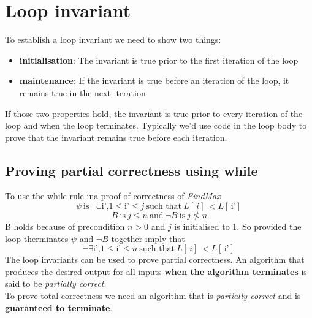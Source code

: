 \documentclass{article}
\begin{document}
\section{Loop invariant}
\begin{center}
\end{center}

\begin{flushleft}
To establish a loop invariant we need to show two things:
\begin{itemize}
	\item \textbf{initialisation}: The invariant is true prior to the first iteration of the loop
	\item \textbf{maintenance}: If the invariant is true before an iteration of the loop, it remains true in the next iteration
\end{itemize}
If those two properties hold, the invariant is true prior to every iteration of the loop and when the loop terminates. Typically we'd use code in the loop body to prove that the invariant remains true before each iteration.
\end{flushleft}

\subsection{Proving partial correctness using while}
\begin{flushleft}
To use the while rule ina proof of correctness of \textit{FindMax}
\[
\psi \: \text{is} \:  \neg \exists \text{i',} 1 \leqslant \text{i'} \leqslant j \: \text{such that} \: L[\,i]\, < L[\, \text{i'} ]\,
\]
\[ B \:\text{is}\: j \leqslant n \: \text{and} \: \neg B \:\text{is}\: j \nleq n \]
B holds because of precondition $n > 0$ and $j$ is initialised to 1. So provided the loop therminates $\psi$ and $\neg B$ together imply that
\[
\neg \exists \text{i',} 1 \leqslant \text{i'} \leqslant n \: \text{such that} \: L[\,i]\, < L[\, \text{i'} ]\,
\]
The loop invariants can be used to prove partial correctness. An algorithm that produces the desired output for all inputs \textbf{when the algorithm terminates} is said to be \textit{partially correct}.\\
To prove total correctness we need an algorithm that is \textit{partially correct} and is \textbf{guaranteed to terminate}.
\end{flushleft}
\end{document}
